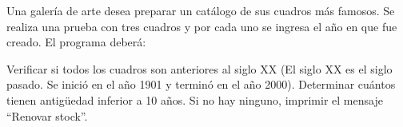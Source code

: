 Una galería de arte desea preparar un catálogo de sus cuadros más famosos. Se realiza una prueba con tres cuadros y por cada uno se ingresa el año en que fue creado. El programa deberá:

Verificar si todos los cuadros son anteriores al siglo XX (El siglo XX es el siglo pasado. Se inició en el año 1901 y terminó en el año 2000).
Determinar cuántos tienen antigüedad inferior a 10 años. Si no hay ninguno, imprimir el mensaje ``Renovar stock''.